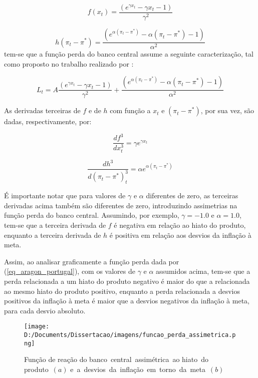 \documentclass[
	article,			%
	11pt,				%
	oneside,			%
	a4paper,			%
	english,			%
	brazil,				%
	]{abntex2}
\begin{document}
	\begin{equation}
		f(x_t) = \frac{(e^{\gamma x_t} - \gamma x_t - 1)}{\gamma^2} 
	\end{equation}
	
	\begin{equation}	
		h(\pi_t - \pi^*) = \frac{(e^{\alpha (\pi_t - \pi^*)} - \alpha (\pi_t - \pi^*) - 1)}{\alpha^2}
	\end{equation}
%
	tem-se que a função perda do banco central assume a seguinte caracterização, tal como proposto no trabalho realizado por :
	
	\begin{equation} \label{eq_aragon_portugal}
		L_t = A \frac{(e^{\gamma x_t} - \gamma x_t - 1)}{\gamma^2} + \frac{(e^{\alpha (\pi_t - \pi^*)} - \alpha (\pi_t - \pi^*) - 1)}{\alpha^2}
	\end{equation}
	
	As derivadas terceiras de $f$ e de $h$ com função a $x_t$ e $(\pi_t - \pi^*)$, por sua vez, são dadas, respectivamente, por:
	
	\begin{equation}
		\frac{df^3}{dx_t^3} = \gamma e^{\gamma x_t}
	\end{equation}
	
	\begin{equation}
		\frac{dh^3}{d(\pi_t - \pi^*)_t^3} = \alpha e^{\alpha (\pi_t - \pi^*)}
	\end{equation}
	
	É importante notar que para valores de $\gamma$ e $\alpha$ diferentes de zero, as terceiras derivadas acima também são diferentes de zero, introduzindo assimetrias na função perda do banco central. Assumindo, por exemplo, $\gamma = -1.0$ e $\alpha = 1.0$, tem-se que a terceira derivada de $f$ é negativa em relação ao hiato do produto, enquanto a terceira derivada de $h$ é positiva em relação aos desvios da inflação à meta.
	
	Assim, ao analisar graficamente a função perda dada por (\ref{eq_aragon_portugal}), com os valores de $\gamma$ e $\alpha$ assumidos acima, tem-se que a perda relacionada a um hiato do produto negativo é maior do que a relacionada ao mesmo hiato do produto positivo, enquanto a perda relacionada a desvios positivos da inflação à meta é maior que a desvios negativos da inflação à meta, para cada desvio absoluto.
		
	\hfill \break
	\hfill \break
	\hfill \break
	\hfill \break
	\hfill \break

	\begin{figure}[!h]
	\texttt{[image: D:/Documents/Dissertacao/imagens/funcao\_perda\_assimetrica.png]}
	\caption{Função de reação do banco~central~assimétrica~ao hiato~do produto~$(a)$ e~a~desvios~da~inflação~em~torno~da~meta~$(b)$}
	\label{fig:funcao reacao assimetrica}
	\end{figure}
	
\end{document}
